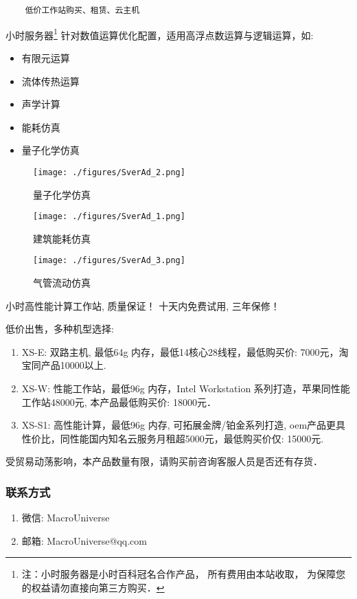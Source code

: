 

\begin{lstlisting}
    低价工作站购买、租赁、云主机
\end{lstlisting}

小时服务器\footnote{注：小时服务器是小时百科冠名合作产品， 所有费用由本站收取， 为保障您的权益请勿直接向第三方购买．} 针对数值运算优化配置，适用高浮点数运算与逻辑运算，如:
\begin{itemize}
\item 有限元运算
\item 流体传热运算
\item 声学计算
\item 能耗仿真
\item 量子化学仿真
\end{itemize}
\begin{figure}[ht]
\centering
\texttt{[image: ./figures/SverAd\_2.png]}
\caption{量子化学仿真} \label{SverAd_fig2}
\end{figure}
\begin{figure}[ht]
\centering
\texttt{[image: ./figures/SverAd\_1.png]}
\caption{建筑能耗仿真} \label{SverAd_fig1}
\end{figure}
\begin{figure}[ht]
\centering
\texttt{[image: ./figures/SverAd\_3.png]}
\caption{气管流动仿真} \label{SverAd_fig3}
\end{figure}

小时高性能计算工作站, 质量保证！ 十天内免费试用, 三年保修！

低价出售，多种机型选择:
\begin{enumerate}
\item XS-E: 双路主机, 最低64g 内存，最低14核心28线程，最低购买价: 7000元，淘宝同产品10000以上.
\item XS-W: 性能工作站，最低96g 内存，Intel Workstation 系列打造，苹果同性能工作站48000元, 本产品最低购买价: 18000元．
\item XS-S1: 高性能计算，最低96g 内存, 可拓展金牌/铂金系列打造, oem产品更具性价比，同性能国内知名云服务月租超5000元，最低购买价仅: 15000元.

\end{enumerate}

受贸易动荡影响，本产品数量有限，请购买前咨询客服人员是否还有存货．
\subsubsection{联系方式}
\begin{enumerate}
\item 微信: MacroUniverse
\item 邮箱: MacroUniverse@qq.com
\end{enumerate}


